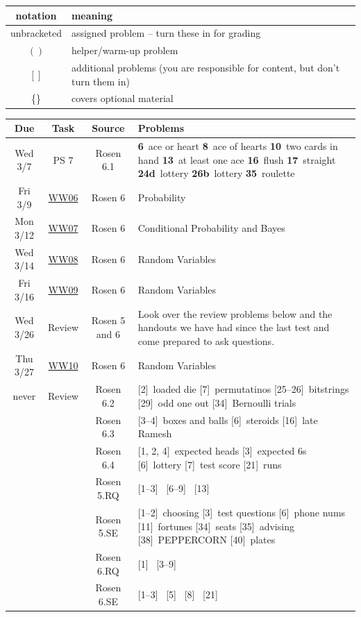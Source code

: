 \documentclass{scrartcl}\usepackage[]{graphicx}\usepackage[]{color}
\def\WW#1{\href{https://mathwebwork.cs.calvin.edu/webwork2/Math252-S18-Pruim/WW#1}{WW#1}}
\def\hwn#1{\relax}
\def\hwn#1{\ {\tiny (#1)}}
\def\hwn#1{$_{\mbox{\ \tiny #1}}$}
\def\hwn#1{~{\tiny #1}}
\newcommand{\extra}[2][\relax]{[#2]\hwn{#1}}
\newcommand{\mand}[2][\relax]{{\bf \large #2}\hwn{#1}}
\begin{document}
\begin{center}

\iftrue

\begin{longtable}{|c|l|}
  \hline
  notation & meaning \\
  \hline
  unbracketed & assigned problem -- turn these in for grading \\
  $()$ & helper/warm-up problem  \\
  $[]$ & additional problems (you are responsible for content, but don't turn them in) \\
  \{\} & covers optional material \\
  \hline
\end{longtable}
\fi

\bigskip


\begin{longtable}{|c|c|c|p{4.3in}|}
  \hline
  Due & Task & Source & Problems \\
  \hline\hline
  \endhead
   Wed 3/7 & PS 7 & Rosen 6.1 &
   \mand[ace or heart]{6}
   \mand[ace of hearts]{8}
   \mand[two cards in hand]{10}
   \mand[at least one ace]{13}
   \mand[flush]{16}
   \mand[straight]{17}
   \mand[lottery]{24d}
   \mand[lottery]{26b}
   \mand[roulette]{35}
	 \\
	   \hline
	 Fri 3/9 & \WW{06} & Rosen 6 & Probability
	 \\
	   \hline
	 Mon 3/12 & \WW{07} & Rosen 6 & Conditional Probability and Bayes
	 \\
	   \hline
	 Wed 3/14 & \WW{08} & Rosen 6 & Random Variables
	 \\
	   \hline
	 Fri 3/16 & \WW{09} & Rosen 6 & Random Variables
	 \\
	   \hline
	 Wed 3/26 & Review & Rosen 5 and 6 & Look over the review problems below and the handouts we have had since the last
	                       test and come prepared to ask questions.
	 \\
	 \hline
	 Thu 3/27 & \WW{10} & Rosen 6 & Random Variables
	 \\
	   \hline
	 never & Review & Rosen 6.2 &
   \extra[loaded die]{2}
   \extra[permutatinos]{7}
	 \extra[bitstrings]{25--26}
	 \extra[odd one out]{29}
   \extra[Bernoulli trials]{34}
	 \\
	 && Rosen 6.3 &
	 \extra[boxes and balls]{3--4}
	 \extra[steroids]{6}
	 \extra[late Ramesh]{16}
   \\
   & & Rosen 6.4 &
   \extra[expected heads]{1, 2, 4}
   \extra[expected 6s]{3}
   \extra[lottery]{6}
   \extra[test score]{7}
   \extra[runs]{21}
   \\
   & & Rosen 5.RQ &
   \extra{1--3}
   \extra{6--9}
   \extra{13}
   \\
   & & Rosen 5.SE &
   \extra[choosing]{1--2}
   \extra[test questions]{3}
   \extra[phone nums]{6}
   \extra[fortunes]{11}
   \extra[seats]{34}
   \extra[advising]{35}
   \extra[PEPPERCORN]{38}
   \extra[plates]{40}
   \\
   & & Rosen 6.RQ &
   \extra{1}
   \extra{3--9}
   \\
   & & Rosen 6.SE &
   \extra{1--3}
   \extra{5}
   \extra{8}
   \extra{21}
   \\
	   \hline
\end{longtable}
\end{center}
\label{end}
\end{document}
